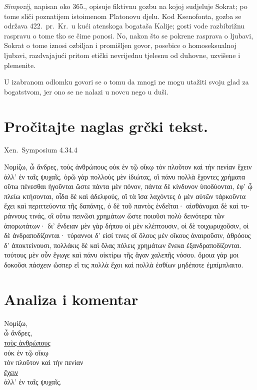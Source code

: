 \textit{Simpozij}, napisan oko 365., opisuje fiktivnu gozbu na kojoj sudjeluje Sokrat; po tome sliči poznatijem istoimenom Platonovu djelu. Kod Ksenofonta, gozba se održava 422.\ pr.~Kr.\ u kući atenskoga bogataša Kalije; gosti vode razbibrižnu raspravu o tome tko se čime ponosi. No, nakon što se pokrene rasprava o ljubavi, Sokrat o tome iznosi ozbiljan i promišljen govor, posebice o homoseksualnoj ljubavi, razdvajajući pritom etički nevrijednu tjelesnu od duhovne, uzvišene i plemenite. 

U izabranom odlomku govori se o tomu da mnogi ne mogu utažiti svoju glad za bogatstvom, jer ono se ne nalazi u novcu nego u duši.


\section*{Pročitajte naglas grčki tekst.}

Xen.\ Symposium 4.34.4


\medskip

{\large
\begin{greek}
\noindent Νομίζω, ὦ ἄνδρες, τοὺς ἀνθρώπους οὐκ ἐν τῷ οἴκῳ τὸν πλοῦτον καὶ τὴν πενίαν ἔχειν ἀλλ' ἐν ταῖς ψυχαῖς. ὁρῶ γὰρ πολλοὺς μὲν ἰδιώτας, οἳ πάνυ πολλὰ ἔχοντες χρήματα οὕτω πένεσθαι ἡγοῦνται ὥστε πάντα μὲν πόνον, πάντα δὲ κίνδυνον ὑποδύονται, ἐφ' ᾧ πλείω κτήσονται, οἶδα δὲ καὶ ἀδελφούς, οἳ τὰ ἴσα λαχόντες ὁ μὲν αὐτῶν τἀρκοῦντα ἔχει καὶ περιττεύοντα τῆς δαπάνης, ὁ δὲ τοῦ παντὸς ἐνδεῖται· αἰσθάνομαι δὲ καὶ τυράννους τινάς, οἳ οὕτω πεινῶσι χρημάτων ὥστε ποιοῦσι πολὺ δεινότερα τῶν ἀπορωτάτων· δι' ἔνδειαν μὲν γὰρ δήπου οἱ μὲν κλέπτουσιν, οἱ δὲ τοιχωρυχοῦσιν, οἱ δὲ ἀνδραποδίζονται· τύραννοι δ' εἰσί τινες οἳ ὅλους μὲν οἴκους ἀναιροῦσιν, ἁθρόους δ' ἀποκτείνουσι, πολλάκις δὲ καὶ ὅλας πόλεις χρημάτων ἕνεκα ἐξανδραποδίζονται. τούτους μὲν οὖν ἔγωγε καὶ πάνυ οἰκτίρω τῆς ἄγαν χαλεπῆς νόσου. ὅμοια γάρ μοι δοκοῦσι πάσχειν ὥσπερ εἴ τις πολλὰ ἔχοι καὶ πολλὰ ἐσθίων μηδέποτε ἐμπίμπλαιτο.

\end{greek}

}

\newpage


\section*{Analiza i komentar}


{\large
\noindent Νομίζω, \\
\tabto{2em} ὦ ἄνδρες, \\
\underline{τοὺς ἀνθρώπους} \\
\tabto{2em} οὐκ ἐν τῷ οἴκῳ \\
\tabto{4em} τὸν πλοῦτον καὶ τὴν πενίαν\\
\tabto{4em}  \underline{ἔχειν} \\
\tabto{2em} ἀλλ' ἐν ταῖς ψυχαῖς.\\

}

